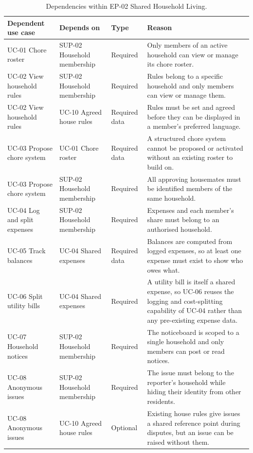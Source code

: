 \documentclass[11pt,a4paper]{article}
\begin{document}
\begin{table}[H]
    \centering
    \small
    \caption{Dependencies within EP-02 Shared Household Living.}
    \begin{tabularx}{\textwidth}{@{}L{2.9cm}L{3.3cm}L{2.1cm}Y@{}}
        \toprule
        Dependent use case & Depends on & Type & Reason\\
        \midrule
        UC-01 Chore roster & SUP-02 Household membership & Required & Only members of an active household can view or manage its chore roster.\\
        UC-02 View household rules & SUP-02 Household membership & Required & Rules belong to a specific household and only members can view or manage them.\\
        UC-02 View household rules & UC-10 Agreed house rules & Required data & Rules must be set and agreed before they can be displayed in a member's preferred language.\\
        UC-03 Propose chore system & UC-01 Chore roster & Required data & A structured chore system cannot be proposed or activated without an existing roster to build on.\\
        UC-03 Propose chore system & SUP-02 Household membership & Required & All approving housemates must be identified members of the same household.\\
        UC-04 Log and split expenses & SUP-02 Household membership & Required & Expenses and each member's share must belong to an authorised household.\\
        UC-05 Track balances & UC-04 Shared expenses & Required data & Balances are computed from logged expenses, so at least one expense must exist to show who owes what.\\
        UC-06 Split utility bills & UC-04 Shared expenses & Required & A utility bill is itself a shared expense, so UC-06 reuses the logging and cost-splitting capability of UC-04 rather than any pre-existing expense data.\\
        UC-07 Household notices & SUP-02 Household membership & Required & The noticeboard is scoped to a single household and only members can post or read notices.\\
        UC-08 Anonymous issues & SUP-02 Household membership & Required & The issue must belong to the reporter's household while hiding their identity from other residents.\\
        UC-08 Anonymous issues & UC-10 Agreed house rules & Optional & Existing house rules give issues a shared reference point during disputes, but an issue can be raised without them.\\
        \bottomrule
    \end{tabularx}
    \label{tabdepshousehold}
\end{table}
\end{document}

